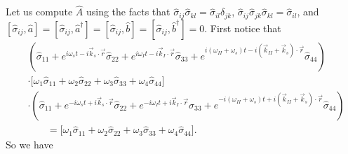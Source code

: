 \documentclass[aps,pra,showpacs,amsmath,amssymb,nofootinbib,longbibliography,superscriptaddress
]{revtex4-1}
\theoremstyle{definition}
\theoremstyle{remark}
\newcommand{\0}{\hat{0}}
\begin{document}
Let us compute $\hat{A}$ using the facts that $\hat{\sigma}_{ij} \hat{\sigma}_{kl} = \hat{\sigma}_{il} \delta_{jk}$, $\hat{\sigma}_{ij} \hat{\sigma}_{jk} \hat{\sigma}_{kl} = \hat{\sigma}_{il}$, and $[\hat{\sigma}_{ij}, \hat{a}] = [\hat{\sigma}_{ij}, \hat{a}^{\dagger}] = [\hat{\sigma}_{ij}, \hat{b}] = [\hat{\sigma}_{ij}, \hat{b}^{\dagger}] = 0$. First notice that
\begin{align}
&\left(
    \hat{\sigma}_{11} +
    e^{i \omega_s t - i \vec{k}_s \cdot \vec{r}} \hat{\sigma}_{22} +
    e^{i \omega_I t - i \vec{k}_I \cdot \vec{r}} \hat{\sigma}_{33} +
    e^{i(\omega_{II} + \omega_s) t - i(\vec{k}_{II} + \vec{k}_s) \cdot \vec{r}} \hat{\sigma}_{44}
\right) \nonumber\\
&\cdot\biggl[
    \omega_1 \hat{\sigma}_{11} +
    \omega_2 \hat{\sigma}_{22} +
    \omega_3 \hat{\sigma}_{33} +
    \omega_4 \hat{\sigma}_{44}
\biggr] \nonumber \\
&\cdot\left(
    \hat{\sigma}_{11} +
    e^{-i \omega_s t + i \vec{k}_s \cdot \vec{r}} \hat{\sigma}_{22} +
    e^{-i \omega_I t + i \vec{k}_I \cdot \vec{r}} \hat{\sigma}_{33} +
    e^{-i(\omega_{II} + \omega_s) t + i(\vec{k}_{II} + \vec{k}_s) \cdot \vec{r}} \hat{\sigma}_{44}
\right) \nonumber\\
&\;\;\;\;\;\;\; = 
\biggl[
    \omega_1 \hat{\sigma}_{11} +
    \omega_2 \hat{\sigma}_{22} +
    \omega_3 \hat{\sigma}_{33} +
    \omega_4 \hat{\sigma}_{44}
\biggr].
\end{align}
So we have
\end{document}
